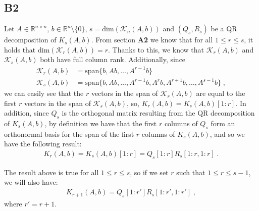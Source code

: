 \documentclass[a4paper,10pt]{article}
\begin{document}
\subsection*{B2}

Let $A \in \mathbb{R}^{n \times n}$, $b \in \mathbb{R}^n \setminus \{0\}$, $s = \text{dim}(\mathcal{K}_n(A,b))$ and $(Q_s,R_s)$ be a QR decomposition of $K_s(A,b)$. From section \textbf{A2} we know that for all $1 \leq r \leq s$, it holds that $\text{dim}(\mathcal{K}_r(A,b)) = r$. Thanks to this, we know that $\mathcal{K}_r(A,b)$ and $\mathcal{K}_s(A,b)$ both have full column rank. Additionally, since
\begin{align*}
    \mathcal{K}_r(A,b) &= \text{span}\{ b,Ab,\dots,A^{r-1}b \} \\
    \mathcal{K}_s(A,b) &= \text{span}\{ b,Ab,\dots,A^{r-1}b,A^rb,A^{r+1}b,\dots,A^{s-1}b \} \; , 
\end{align*}
we can easily see that the $r$ vectors in the span of $\mathcal{K}_r(A,b)$ are equal to the first $r$ vectors in the span of $\mathcal{K}_s(A,b)$, so, $K_r(A,b) = K_s(A,b)[1:r]$. In addition, since $Q_s$ is the orthogonal matrix resulting from the QR decomposition of $K_s(A,b)$, by definition we have that the first $r$ columns of $Q_s$ form an orthonormal basis for the span of the first $r$ columns of $K_s(A,b)$, and so we have the following result:
\begin{align}\label{eq:B2_first_result}
    K_r(A,b) = K_s(A,b)[1:r] = Q_s[1:r] R_s[1:r,1:r] \; .
\end{align}

The result above is true for all $1 \leq r \leq s$, so if we set $r$ such that $1 \leq r \leq s-1$, we will also have:
\begin{align}\label{eq:B2_second_result}
    K_{r+1}(A,b) = Q_s[1:r'] R_s[1:r',1:r'] \; ,
\end{align}
where $r' = r+1$. \\
\end{document}
